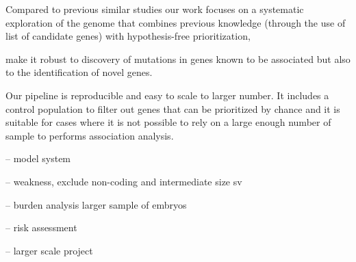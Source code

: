 Compared to previous similar studies our work focuses on a systematic exploration of the genome that combines previous knowledge (through the use of list of candidate genes) with hypothesis-free prioritization, 


make it robust to discovery of mutations in genes known to be associated but also to the identification of novel genes. 



Our pipeline is reproducible and easy to scale to larger number. It includes a control population to filter out genes that can be prioritized by chance and it is suitable for cases where it is not possible to rely on a large enough number of sample to performs association analysis. 


-- model system 


-- weakness, exclude non-coding and intermediate size sv 







-- burden analysis larger sample of embryos 



-- risk assessment


-- larger scale project 






